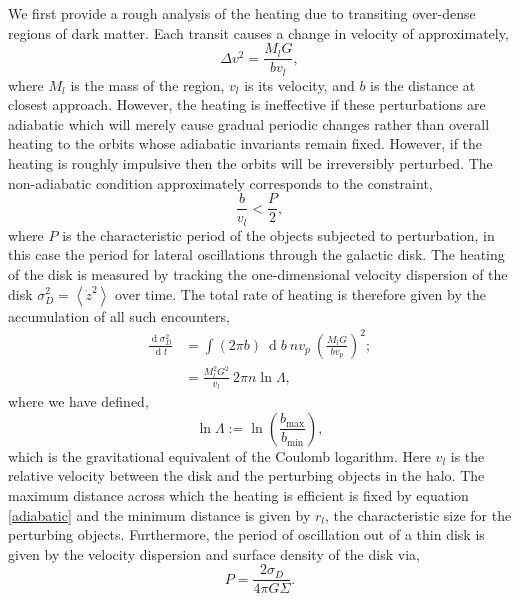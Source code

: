\documentclass[usenatbib]{mnras}
\renewcommand{\d}[1]{\! \mathrm{d}#1 \:}
\newcommand{\deriv}[2]{\frac{\d{#1}}{\d{#2}}}
\renewcommand{\d}[1]{\ensuremath{\operatorname{d}\!{#1}}}
\begin{document}
We first provide a rough analysis of the heating due to transiting over-dense regions of dark matter. Each transit causes a change in velocity of approximately,
\begin{equation}
\Delta v^2 = \frac{M_l G}{b v_l},
\end{equation}
where $M_l$ is the mass of the region, $v_l$ is its velocity, and $b$ is the distance at closest approach. However, the heating is ineffective if these perturbations are adiabatic which will merely cause gradual periodic changes rather than overall heating to the orbits whose adiabatic invariants remain fixed. However, if the heating is roughly impulsive then the orbits will be irreversibly perturbed. The non-adiabatic condition approximately corresponds to the constraint,
\begin{equation} \label{adiabatic}
\frac{b}{v_l} < \frac{P}{2},
\end{equation}
where $P$ is the characteristic period of the objects subjected to perturbation, in this case the period for lateral oscillations through the galactic disk. The heating of the disk is measured by tracking the one-dimensional velocity dispersion of the disk $\sigma_D^2 = \left< \dot{z}^2 \right>$ over time. The total rate of heating is therefore given by the accumulation of all such encounters,
\begin{subequations}
\begin{align}
\deriv{\sigma_D^2}{t} &= \int (2 \pi b) \: \d{b} \: n v_p \: \left( \frac{M_l G}{b v_p} \right)^2 ;
\\
& = \frac{M_l^2 G^2}{v_l} \: 2 \pi n \ln{\Lambda},
\end{align}
\end{subequations}
where we have defined,
\begin{equation}
\ln{\Lambda} := \ln{\left( \frac{b_{\text{max}}}{b_{\text{min}}} \right)},
\end{equation}
which is the gravitational equivalent of the Coulomb logarithm. Here $v_l$ is the relative velocity between the disk and the perturbing objects in the halo. 
The maximum distance across which the heating is efficient is fixed by equation \eqref{adiabatic} and the minimum distance is given by $r_l$, the characteristic size for the perturbing objects. Furthermore, the period of oscillation out of a thin disk is given by the velocity dispersion and surface density of the disk via,
\begin{equation}
P = \frac{2 \sigma_D}{4 \pi G \Sigma}.
\end{equation} 
\end{document}
